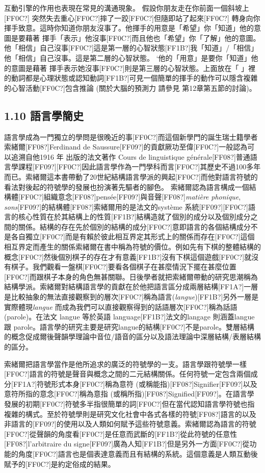 互動引擎的作用也表現在常見的溝通現象。 假設你朋友走在你前面一個斜坡上[FF0C?] 突然失去重心[FF0C?]摔了一跤[FF0C?]但隨即站了起來[FF0C?] 轉身向你揮手致意。這時你知道你朋友沒事了。他揮手的用意是「希望」你「知道」他的意圖是要藉著 揮手「表示」他沒事[FF0C?]而且他也「希望」你「了解」他的意圖。他「相信」自己沒事[FF0C?]這是第一層的心智狀態[FF1B?]我「知道」/「相信」他「相信」自己沒事。這是第二層的心智狀態。 ‘他的「用意」是要你「知道」他的意圖是藉著 揮手表示她沒事[FF0C?]則是第三層的心智狀態。上面放在「  」裡的動詞都是心理狀態或認知動詞[FF1B?]可見一個簡單的揮手的動作可以隱含複雜的心智活動[FF0C?]包含推論 (關於大腦的預測力 請參見 第12章第五節的討論)。    

\subsection{1.10 語言學簡史}

語言學成為一門獨立的學問是很晚近的事[FF0C?]而這個新學門的誕生瑞士籍學者索緒爾[FF08?]Ferdinand de Saussure[FF09?]的貢獻厥功至偉[FF0C?]一般認為可以追溯自他1916 年 出版的法文著作 Cours de linguistique générale[FF08?]普通語言學課程[FF09?][FF0C?]因此語言學作為一門學科而言[FF0C?]其歷史不過100多年而已。索緒爾這本書帶動了20世紀結構語言學派的興起[FF0C?]而他對語言符號的看法對後起的符號學的發展也扮演著先驅者的腳色。 索緒爾認為語言構成一個結構體[FF0C?]組織意念[FF08?]pensée[FF09?]與音聲[FF08?]\textit{matière} \textit{phonique}, \textit{sons}[FF09?]的結構體[FF08?]索緒爾用的是法文的système 系統[FF09?][FF0C?]語言的核心性質在於其結構上的性質[FF1B?]結構造就了個別的成分以及個別成分之間的關係。結構的存在先於個別的結構的成分[FF0C?]意即語言的各個結構成分不是各自獨立[FF0C?]而是有賴於彼此相互界定其形式上的關係而存在[FF0C?]這個相互界定而產生的關係索緒爾在書中稱為符號的價位。例如先有下棋的整體結構的概念[FF0C?]然後個別棋子的存在才有意義[FF1B?]沒有下棋這個遊戲[FF0C?]就沒有棋子。我們觀看一盤棋[FF0C?]要看各個棋子在甚麼情況下擺在甚麼位置[FF0C?]而跟棋子本身的角色無甚關聯。日後學者就把索緒爾帶動的研究思潮稱為結構學派。索緒爾對結構語言學的貢獻在於他把語言區分成兩層結構[FF1A?]一層是比較抽象的無法直接觀察到的層次[FF0C?]稱為語言(\textit{langue})[FF1B?]另外一層是實際體現\textit{langue} 而成為我們可以直接觀察得到的話語層次[FF0C?]稱為話語 (parole)。在法文 langue 等於英語  language[FF1B?]法文的langage 則涵蓋langue 跟 parole。語言學的研究主要是研究langue的結構[FF0C?]不是parole。雙層結構的概念促成爾後聲韻學理論中音位/語音的區分以及語法理論中深層結構/表層結構的區分。  

索緒爾把語言學當作是他所追求的廣泛的符號學的一支。語言學跟符號學一樣[FF0C?]語言的符號是聲音與概念之間的二元結構關係。任何符號一定包含兩個成分[FF1A?]符號形式本身[FF0C?]稱為意符 (或稱能指)[FF08?]Signifier[FF09?]以及意符所指的意念[FF0C?]稱為意指 (或稱所指)[FF08?]Signified[FF09?]。在語言學發展的初期[FF0C?]符號多半指很簡單的詞[FF0C?]但在當代認知語言學符號也指複雜的構式。至於符號學則是研究文化社會中各式各樣的符號[FF08?]語言的以及非語言的[FF09?]的使用以及人類如何賦予這些符號意義。索緒爾認為語言的符號[FF0C?]從聲韻的角度看[FF0C?]是任意而武斷的[FF1B?]從此符號的任意性[FF08?]l'arbitraire du signe[FF09?]廣為人知[FF1B?]但是另外一方面[FF0C?]從功能的角度[FF0C?]語言也是個表達意義而且有結構的系統。這個意義是人類互動後賦予的[FF0C?]是約定俗成的結果。

